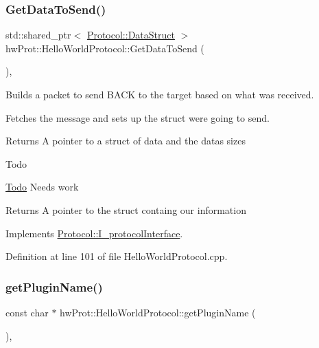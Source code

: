 \subsubsection{\texorpdfstring{GetDataToSend()}{GetDataToSend()}}
{\footnotesize\ttfamily std\+::shared\+\_\+ptr$<$ \mbox{\hyperlink{structProtocol_1_1DataStruct}{Protocol\+::\+Data\+Struct}} $>$ hw\+Prot\+::\+Hello\+World\+Protocol\+::\+Get\+Data\+To\+Send (\begin{DoxyParamCaption}{ }\end{DoxyParamCaption})\hspace{0.3cm}{\ttfamily [override]}, {\ttfamily [virtual]}}



Builds a packet to send B\+A\+CK to the target based on what was received. 

Fetches the message and sets up the struct we\textquotesingle{}re going to send.

\begin{DoxyReturn}{Returns}
A pointer to a struct of data and the data\textquotesingle{}s sizes
\end{DoxyReturn}
\begin{DoxyRefDesc}{Todo}
\item[\mbox{\hyperlink{todo__todo000002}{Todo}}]Needs work \end{DoxyRefDesc}
\begin{DoxyReturn}{Returns}
A pointer to the struct containg our information 
\end{DoxyReturn}


Implements \mbox{\hyperlink{classProtocol_1_1I__protocolInterface_a28ae7afb66757d696858cd3a8f9bc21d}{Protocol\+::\+I\+\_\+protocol\+Interface}}.



Definition at line 101 of file Hello\+World\+Protocol.\+cpp.

\mbox{\label{classhwProt_1_1HelloWorldProtocol_acca6465073e5919a7a74b8f74e869e8e}} 
\subsubsection{\texorpdfstring{getPluginName()}{getPluginName()}}
{\footnotesize\ttfamily const char $\ast$ hw\+Prot\+::\+Hello\+World\+Protocol\+::get\+Plugin\+Name (\begin{DoxyParamCaption}{ }\end{DoxyParamCaption})\hspace{0.3cm}{\ttfamily [override]}, {\ttfamily [virtual]}}



